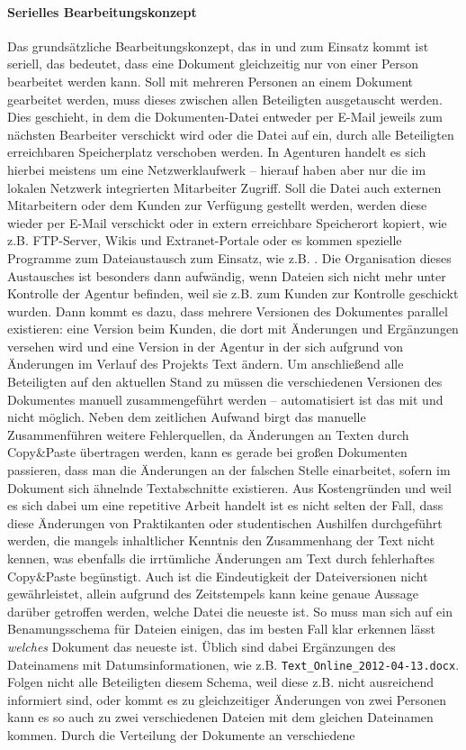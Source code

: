 \label{p:serielles-konzept}\paragraph{Serielles Bearbeitungskonzept} Das grundsätzliche Bearbeitungskonzept, das in  und  zum Einsatz kommt ist seriell, das bedeutet, dass eine Dokument gleichzeitig nur von einer Person bearbeitet werden kann. Soll mit mehreren Personen an einem Dokument gearbeitet werden, muss dieses zwischen allen Beteiligten ausgetauscht werden. Dies geschieht, in dem die Dokumenten-Datei entweder per E-Mail jeweils zum nächsten Bearbeiter verschickt wird oder die Datei auf ein, durch alle Beteiligten erreichbaren Speicherplatz verschoben werden. In Agenturen handelt es sich hierbei meistens um eine Netzwerklaufwerk -- hierauf haben aber nur die im lokalen Netzwerk integrierten Mitarbeiter Zugriff. Soll die Datei auch externen Mitarbeitern oder dem Kunden zur Verfügung gestellt werden, werden diese wieder per E-Mail verschickt oder in extern erreichbare Speicherort kopiert, wie z.B. FTP-Server, Wikis und Extranet-Portale oder es kommen spezielle Programme zum Dateiaustausch zum Einsatz, wie z.B. . Die Organisation dieses Austausches ist besonders dann aufwändig, wenn Dateien sich nicht mehr unter Kontrolle der Agentur befinden, weil sie z.B. zum Kunden zur Kontrolle geschickt wurden. Dann kommt es dazu, dass mehrere Versionen des Dokumentes parallel existieren: eine Version beim Kunden, die dort mit Änderungen und Ergänzungen versehen wird und eine Version in der Agentur in der sich aufgrund von Änderungen im Verlauf des Projekts Text ändern. Um anschließend alle Beteiligten auf den aktuellen Stand zu müssen die verschiedenen Versionen des Dokumentes manuell zusammengeführt werden -- automatisiert ist das mit  und  nicht möglich. Neben dem zeitlichen Aufwand birgt das manuelle Zusammenführen weitere Fehlerquellen, da Änderungen an Texten durch Copy\&Paste übertragen werden, kann es gerade bei großen Dokumenten passieren, dass man die Änderungen an der falschen Stelle einarbeitet, sofern im Dokument sich ähnelnde Textabschnitte existieren. Aus Kostengründen und weil es sich dabei um eine repetitive Arbeit handelt ist es nicht selten der Fall, dass diese Änderungen von Praktikanten oder studentischen Aushilfen durchgeführt werden, die mangels inhaltlicher Kenntnis den Zusammenhang der Text nicht kennen, was ebenfalls die irrtümliche Änderungen am Text durch fehlerhaftes Copy\&Paste begünstigt. Auch ist die Eindeutigkeit der Dateiversionen nicht gewährleistet, allein aufgrund des Zeitstempels kann keine genaue Aussage darüber getroffen werden, welche Datei die neueste ist. So muss man sich auf ein Benamungsschema für Dateien einigen, das im besten Fall klar erkennen lässt \emph{welches} Dokument das neueste ist. Üblich sind dabei Ergänzungen des Dateinamens mit Datumsinformationen, wie z.B. \texttt{Text\_Online\_2012-04-13.docx}. Folgen nicht alle Beteiligten diesem Schema, weil diese z.B. nicht ausreichend informiert sind, oder kommt es zu gleichzeitiger Änderungen von zwei Personen kann es so auch zu zwei verschiedenen Dateien mit dem gleichen Dateinamen kommen. Durch die Verteilung der Dokumente an verschiedene 
